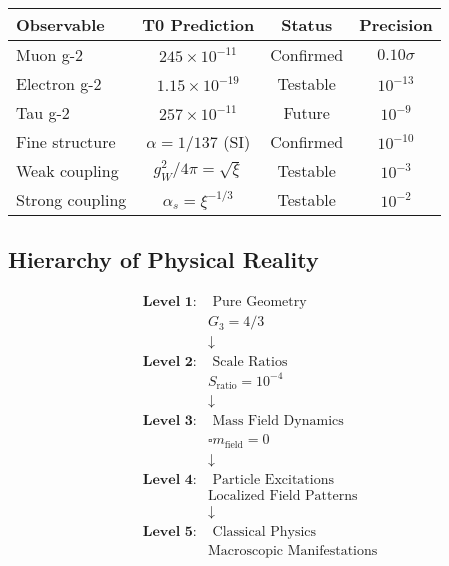 \documentclass[12pt,a4paper]{article}
\begin{document}
	\begin{center}
		\begin{tabular}{|l|c|c|c|}
			\hline
			\textbf{Observable} & \textbf{T0 Prediction} & \textbf{Status} & \textbf{Precision} \\
			\hline
			Muon g-2 & $245 \times 10^{-11}$ & Confirmed & $0.10\sigma$ \\
			Electron g-2 & $1.15 \times 10^{-19}$ & Testable & $10^{-13}$ \\
			Tau g-2 & $257 \times 10^{-11}$ & Future & $10^{-9}$ \\
			Fine structure & $\alpha = 1/137$ (SI) & Confirmed & $10^{-10}$ \\
			Weak coupling & $g_W^2/4\pi = \sqrt{\xi}$ & Testable & $10^{-3}$ \\
			Strong coupling & $\alpha_s = \xi^{-1/3}$ & Testable & $10^{-2}$ \\
			\hline
		\end{tabular}
	\end{center}
	
	\subsection{Hierarchy of Physical Reality}
	
	\begin{align}
		\textbf{Level 1:} &\text{ Pure Geometry} \nonumber \\
		&G_3 = 4/3 \nonumber \\
		&\downarrow \nonumber \\
		\textbf{Level 2:} &\text{ Scale Ratios} \nonumber \\
		&S_{\text{ratio}} = 10^{-4} \nonumber \\
		&\downarrow \nonumber \\
		\textbf{Level 3:} &\text{ Mass Field Dynamics} \nonumber \\
		&\square m_{\text{field}} = 0 \nonumber \\
		&\downarrow \nonumber \\
		\textbf{Level 4:} &\text{ Particle Excitations} \nonumber \\
		&\text{Localized Field Patterns} \nonumber \\
		&\downarrow \nonumber \\
		\textbf{Level 5:} &\text{ Classical Physics} \nonumber \\
		&\text{Macroscopic Manifestations} \nonumber
	\end{align}
	
\end{document}

